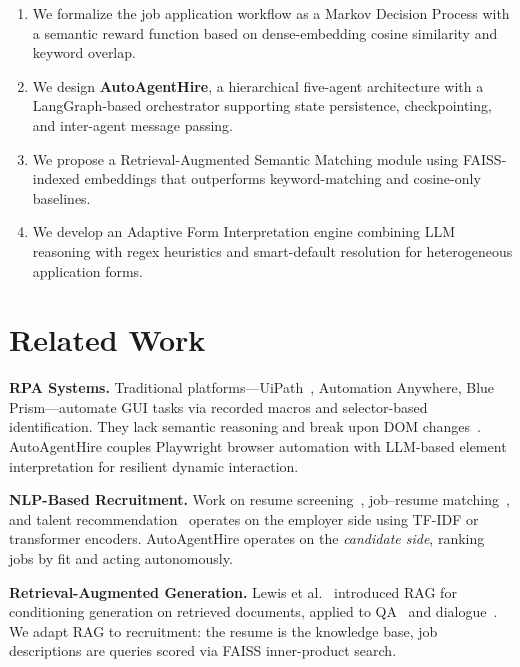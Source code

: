 \documentclass[conference]{IEEEtran}
\begin{document}
\begin{enumerate}
    \item We formalize the job application workflow as a Markov Decision Process with a semantic reward function based on dense-embedding cosine similarity and keyword overlap.
    \item We design \textbf{AutoAgentHire}, a hierarchical five-agent architecture with a LangGraph-based orchestrator supporting state persistence, checkpointing, and inter-agent message passing.
    \item We propose a Retrieval-Augmented Semantic Matching module using FAISS-indexed embeddings that outperforms keyword-matching and cosine-only baselines.
    \item We develop an Adaptive Form Interpretation engine combining LLM reasoning with regex heuristics and smart-default resolution for heterogeneous application forms.
\end{enumerate}

\section{Related Work}

\textbf{RPA Systems.} Traditional platforms---UiPath~\cite{uipath2022}, Automation Anywhere, Blue Prism---automate GUI tasks via recorded macros and selector-based identification. They lack semantic reasoning and break upon DOM changes~\cite{aalst2018rpa}. AutoAgentHire couples Playwright browser automation with LLM-based element interpretation for resilient dynamic interaction.

\textbf{NLP-Based Recruitment.} Work on resume screening~\cite{ats_survey}, job--resume matching~\cite{qin2018enhancing}, and talent recommendation~\cite{zhu2018person} operates on the employer side using TF-IDF or transformer encoders. AutoAgentHire operates on the \emph{candidate side}, ranking jobs by fit and acting autonomously.

\textbf{Retrieval-Augmented Generation.} Lewis et al.~\cite{lewis2020rag} introduced RAG for conditioning generation on retrieved documents, applied to QA~\cite{izacard2021leveraging} and dialogue~\cite{shuster2021retrieval}. We adapt RAG to recruitment: the resume is the knowledge base, job descriptions are queries scored via FAISS inner-product search.
\end{document}
